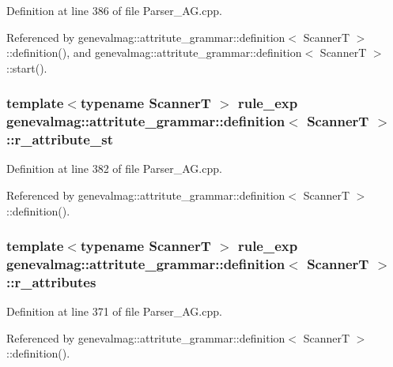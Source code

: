 Definition at line 386 of file Parser\_\-AG.cpp.



Referenced by genevalmag::attritute\_\-grammar::definition$<$ ScannerT $>$::definition(), and genevalmag::attritute\_\-grammar::definition$<$ ScannerT $>$::start().

\hypertarget{structgenevalmag_1_1attritute__grammar_1_1definition_a33e5f0addf7f28dde7855faca702591a}{
\subsubsection[{r\_\-attribute\_\-st}]{\setlength{\rightskip}{0pt plus 5cm}template$<$typename ScannerT $>$ {\bf rule\_\-exp} {\bf genevalmag::attritute\_\-grammar::definition}$<$ ScannerT $>$::{\bf r\_\-attribute\_\-st}}}
\label{structgenevalmag_1_1attritute__grammar_1_1definition_a33e5f0addf7f28dde7855faca702591a}


Definition at line 382 of file Parser\_\-AG.cpp.



Referenced by genevalmag::attritute\_\-grammar::definition$<$ ScannerT $>$::definition().

\hypertarget{structgenevalmag_1_1attritute__grammar_1_1definition_a6fb7be591d4ce361998c33e3f99aaa4a}{
\subsubsection[{r\_\-attributes}]{\setlength{\rightskip}{0pt plus 5cm}template$<$typename ScannerT $>$ {\bf rule\_\-exp} {\bf genevalmag::attritute\_\-grammar::definition}$<$ ScannerT $>$::{\bf r\_\-attributes}}}
\label{structgenevalmag_1_1attritute__grammar_1_1definition_a6fb7be591d4ce361998c33e3f99aaa4a}


Definition at line 371 of file Parser\_\-AG.cpp.



Referenced by genevalmag::attritute\_\-grammar::definition$<$ ScannerT $>$::definition().

